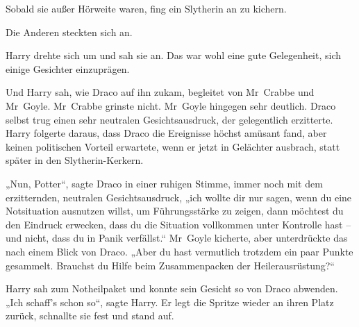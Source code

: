 Sobald sie außer Hörweite waren, fing ein Slytherin an zu kichern.

Die Anderen steckten sich an.

Harry drehte sich um und sah sie an. Das war wohl eine gute Gelegenheit, sich einige Gesichter einzuprägen.

Und Harry sah, wie Draco auf ihn zukam, begleitet von Mr~Crabbe und Mr~Goyle. Mr~Crabbe grinste nicht. Mr~Goyle hingegen sehr deutlich. Draco selbst trug einen sehr neutralen Gesichtsausdruck, der gelegentlich erzitterte. Harry folgerte daraus, dass Draco die Ereignisse höchst amüsant fand, aber keinen politischen Vorteil erwartete, wenn er jetzt in Gelächter ausbrach, statt später in den Slytherin-Kerkern.

„Nun, Potter“, sagte Draco in einer ruhigen Stimme, immer noch mit dem erzitternden, neutralen Gesichtsausdruck, „ich wollte dir nur sagen, wenn du eine Notsituation ausnutzen willst, um Führungsstärke zu zeigen, dann möchtest du den Eindruck erwecken, dass du die Situation vollkommen unter Kontrolle hast – und nicht, dass du in Panik verfällst.“ Mr~Goyle kicherte, aber unterdrückte das nach einem Blick von Draco. „Aber du hast vermutlich trotzdem ein paar Punkte gesammelt. Brauchst du Hilfe beim Zusammenpacken der Heilerausrüstung?“

Harry sah zum Notheilpaket und konnte sein Gesicht so von Draco abwenden. „Ich schaff’s schon so“, sagte Harry. Er legt die Spritze wieder an ihren Platz zurück, schnallte sie fest und stand auf.

